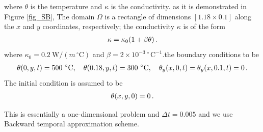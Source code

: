 \documentclass[]{article}
\begin{document}
where $\theta$ is the temperature and $\kappa$ is the conductivity. as it is demonstrated in Figure \ref{fig_SB}, The domain $\Omega$ is a rectangle of dimensions $[1.18 \times 0.1]$ along the $x$ and $y$ coordinates, respectively; the conductivity $\kappa$ is of the form
\begin{equation}\label{eq2}
	\begin{aligned}
		\kappa = \kappa_0(1+\beta\theta)\thinspace.
	\end{aligned}
\end{equation}
where $\kappa_0=0.2 \ \text{W}/(m^{\ \circ}\text{C})$ and $\beta=2 \times 10^{-3 \ \circ}\text{C}^{-1}$.the boundary conditions to be
\begin{equation}\label{eq3}
	\begin{aligned}
		\theta(0,y,t) = 500^{ \ \circ}\text{C} , \quad \theta(0.18,y,t) = 300^{ \ \circ}\text{C}, \quad \theta_y(x,0,t) = \theta_y(x,0.1,t)=0\thinspace.
	\end{aligned}
\end{equation}
The initial condition is assumed to be
\begin{equation}\label{eq4}
	\begin{aligned}
		\theta(x,y,0) = 0\thinspace.
	\end{aligned}
\end{equation}

This is essentially a one-dimensional problem and $\Delta t = 0.005$ and we use Backward temporal approximation scheme.
\end{document}
